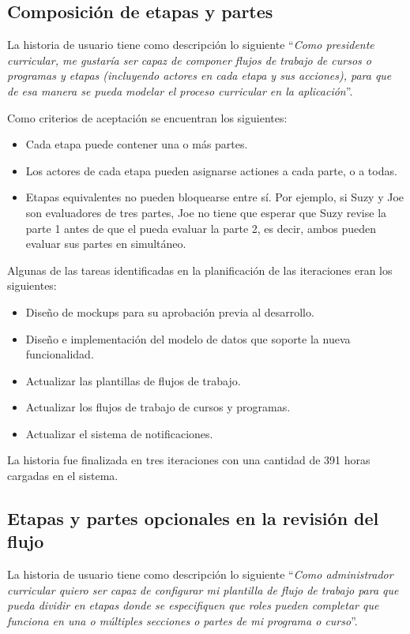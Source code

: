 \subsection{Composición de etapas y partes}
La historia de usuario tiene como descripción lo siguiente \enquote{\textit{Como presidente curricular, me gustaría ser capaz de componer flujos de trabajo de cursos o programas y etapas (incluyendo actores en cada etapa y sus acciones), para que de esa manera se pueda modelar el proceso curricular en la aplicación}}.

Como criterios de aceptación se encuentran los siguientes:
\begin{itemize}
	\item Cada etapa puede contener una o más partes.
	\item Los actores de cada etapa pueden asignarse actiones a cada parte, o a todas.
	\item Etapas equivalentes no pueden bloquearse entre sí. Por ejemplo, si Suzy y Joe son evaluadores de tres partes, Joe no tiene que esperar que Suzy revise la parte 1 antes de que el pueda evaluar la parte 2, es decir, ambos pueden evaluar sus partes en simultáneo.
\end{itemize}

Algunas de las tareas identificadas en la planificación de las iteraciones eran los siguientes:
\begin{itemize}
	\item Diseño de mockups para su aprobación previa al desarrollo.
	\item Diseño e implementación del modelo de datos que soporte la nueva funcionalidad.
	\item Actualizar las plantillas de flujos de trabajo.
	\item Actualizar los flujos de trabajo de cursos y programas.
	\item Actualizar el sistema de notificaciones.
\end{itemize}

La historia fue finalizada en tres iteraciones con una cantidad de 391 horas cargadas en el sistema.

\subsection{Etapas y partes opcionales en la revisión del flujo}
La historia de usuario tiene como descripción lo siguiente \enquote{\textit{Como administrador curricular quiero ser capaz de configurar mi plantilla de flujo de trabajo para que pueda dividir en etapas donde se especifiquen que roles pueden completar que funciona en una o múltiples secciones o partes de mi programa o curso}}.

